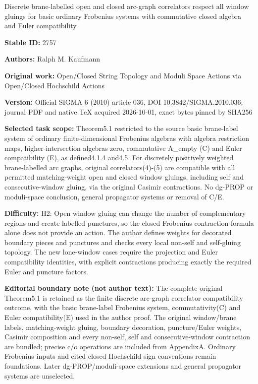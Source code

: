 \documentclass[11pt]{article}
\begin{document}
\begin{center}\Large Discrete brane-labelled open and closed arc-graph correlators respect all window gluings for basic ordinary Frobenius systems with commutative closed algebra and Euler compatibility\end{center}
\noindent\textbf{Stable ID:} 2757\par
\noindent\textbf{Authors:} Ralph M. Kaufmann\par
\noindent\textbf{Original work:} Open/Closed String Topology and Moduli Space Actions via Open/Closed Hochschild Actions\par
\noindent\textbf{Version:} Official SIGMA 6 (2010) article 036, DOI 10.3842/SIGMA.2010.036; journal PDF and native TeX acquired 2026-10-01, exact bytes pinned by SHA256\par
\noindent\textbf{Selected task scope:} Theorem5.1 restricted to the source basic brane-label system of ordinary finite-dimensional Frobenius algebras with algebra restriction maps, higher-intersection algebras zero, commutative A\_empty (C) and Euler compatibility (E), as defined4.1.4 and4.5. For discretely positively weighted brane-labelled arc graphs, original correlators(4)-(5) are compatible with all permitted matching-weight open and closed window gluings, including self and consecutive-window gluing, via the original Casimir contractions. No dg-PROP or moduli-space conclusion, general propagator systems or removal of C/E.\par
\noindent\textbf{Difficulty:} H2: Open window gluing can change the number of complementary regions and create labelled punctures, so the closed Frobenius contraction formula alone does not provide an action. The author defines weights for decorated boundary pieces and punctures and checks every local non-self and self-gluing topology. The new lone-window cases require the projection and Euler compatibility identities, with explicit contractions producing exactly the required Euler and puncture factors.\par
\noindent\textbf{Editorial boundary note (not author text):} The complete original Theorem5.1 is retained as the finite discrete arc-graph correlator compatibility outcome, with the basic brane-label Frobenius system, commutativity(C) and Euler compatibility(E) used in the author proof. The original window/brane labels, matching-weight gluing, boundary decoration, puncture/Euler weights, Casimir composition and every non-self, self and consecutive-window contraction are bundled; precise c/o operations are included from AppendixA. Ordinary Frobenius inputs and cited closed Hochschild sign conventions remain foundations. Later dg-PROP/moduli-space extensions and general propagator systems are unselected.\par
\end{document}
